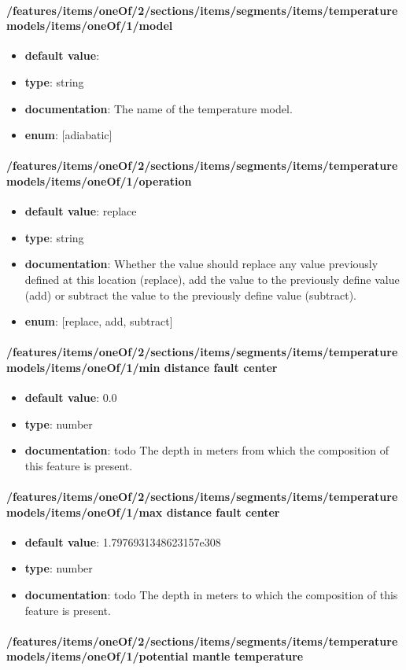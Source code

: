 \paragraph{/features/items/oneOf/2/sections/items/segments/items/temperature models/items/oneOf/1/model}
\begin{itemize}\item {\bf default value}: 
\item {\bf type}: string
\item {\bf documentation}: The name of the temperature model.
\item {\bf enum}: [adiabatic]\end{itemize}\paragraph{/features/items/oneOf/2/sections/items/segments/items/temperature models/items/oneOf/1/operation}
\begin{itemize}\item {\bf default value}: replace
\item {\bf type}: string
\item {\bf documentation}: Whether the value should replace any value previously defined at this location (replace), add the value to the previously define value (add) or subtract the value to the previously define value (subtract).
\item {\bf enum}: [replace, add, subtract]\end{itemize}\paragraph{/features/items/oneOf/2/sections/items/segments/items/temperature models/items/oneOf/1/min distance fault center}
\begin{itemize}\item {\bf default value}: 0.0
\item {\bf type}: number
\item {\bf documentation}: todo The depth in meters from which the composition of this feature is present.
\end{itemize}\paragraph{/features/items/oneOf/2/sections/items/segments/items/temperature models/items/oneOf/1/max distance fault center}
\begin{itemize}\item {\bf default value}: 1.7976931348623157e308
\item {\bf type}: number
\item {\bf documentation}: todo The depth in meters to which the composition of this feature is present.
\end{itemize}\paragraph{/features/items/oneOf/2/sections/items/segments/items/temperature models/items/oneOf/1/potential mantle temperature}
